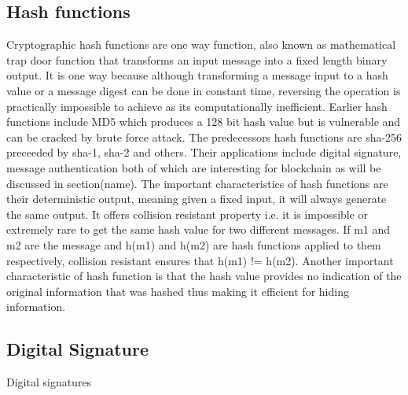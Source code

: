 
\subsection{Hash functions}
Cryptographic hash functions are one way function, also known as mathematical trap door function that transforms an input message into a fixed length binary output. It 
is one way because although transforming a message input to a hash value or a message 
digest can be done in constant time, reversing the operation is practically 
impossible to achieve as its computationally inefficient. 
Earlier hash functions include 
MD5 which produces a 128 bit hash value but is vulnerable and can be cracked by brute 
force attack. The predecessors hash functions are sha-256 preceeded by sha-1, sha-2
and others. 
Their applications include digital signature, message authentication both of 
which are interesting for blockchain as will be discussed in section(name). The
important characteristics of hash functions are their deterministic output, meaning
given a fixed input, it will always generate the same output. It offers collision 
resistant property i.e. it is 
impossible or extremely rare to get the same hash value for two different messages. 
If m1 and m2 are the message and h(m1) and h(m2) are hash functions applied to them 
respectively, collision resistant ensures that h(m1) != h(m2). 
Another important characteristic of hash function is that the hash value provides no 
indication of the original information that was hashed thus making it efficient for 
hiding information. 


\subsection{Digital Signature}
Digital signatures 


